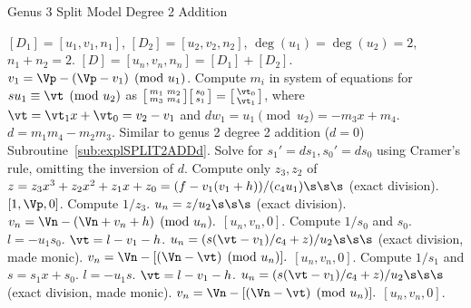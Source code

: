 \begin{algorithm}[H]
\caption{Genus 3 Split Model Degree 2 Addition\label{alg:g3explSPLIT2ADD}}
\begin{algorithmic} [1]
\Require $[D_1] = [u_1,v_1,n_1]$, $[D_2] = [u_2,v_2,n_2]$, $\deg(u_1) = \deg(u_2) = 2$, $n_1 + n_2 = 2$.
\Ensure $[D] = [u_n,v_n,n_n] = [D_1] + [D_2] $.
\algrule
\vspace{-2pt}
\State $v_1 = \Vp - (\Vp - v_1) \pmod{u_1}$.
\State Compute $m_i$ in system of equations for $su_1\equiv \vt \pmod{u_2}$ as $ \bigl[ \begin{smallmatrix} m_1 & m_2\\ m_3 & m_4\end{smallmatrix}\bigr] \bigl[ \begin{smallmatrix} s_0\\ s_1 \end{smallmatrix} \bigr ] = \bigl[ \begin{smallmatrix}\vt_0 \\  \vt_1\end{smallmatrix} \bigr ]$, where $\vt = \vt_1x + \vt_0 = v_2 - v_1$ and $dw_1 = u_1 \pmod{u_2} = -m_3x + m_4$.
\State $d = m_1m_4 - m_2m_3$.
    \State Similar to genus 2 degree 2 addition ($d=0$) Subroutine~\ref{sub:explSPLIT2ADDd}.
\EndIf
\State Solve for $s_1' = ds_1, s_0' = ds_0$ using Cramer's rule, omitting the inversion of $d$.
\State Compute only $z_3, z_2$ of $z = z_3x^3 + z_2x^2 + z_1x + z_0 = (f - v_1(v_1 + h))/(c_4u_1) \s\s\s$ (exact division).  
         \Return $[1,\Vp,0]$.
        \Else \hspace{3pt} Compute $1/z_3$.
            \State $u_n = z/u_2 \s\s\s$ (exact division).
            \State $v_n = \Vn - (\Vn + v_n + h) \pmod{u_n}.$
            \State \Return $[u_n,v_n,0]$.
        \EndIf
    \Else \hspace{3pt} Compute $1/s_0$ and $s_0$.
        \State $l = -u_1s_0$.
        \State $\vt = l - v_1 - h$.
        \State $u_n = (s(\vt - v_1)/c_4 + z)/u_2 \s\s\s$ (exact division, made monic).
        \State $v_n = \Vn - [(\Vn - \vt) \pmod{u_n}].$
        \State \Return $[u_n,v_n,0]$.
    \EndIf
\EndIf
\State Compute $1/s_1$ and $s = s_1x + s_0$.
\State $l = -u_1s$.
\State $\vt = l - v_1 - h$.
\State $u_n = (s(\vt - v_1)/c_4 + z)/u_2 \s\s\s$ (exact division, made monic).
\State $v_n = \Vn - [(\Vn - \vt) \pmod{u_n}].$ 
\State \Return $[u_n,v_n,0]$.
\vspace{-2pt}
\end{algorithmic}
\end{algorithm}


